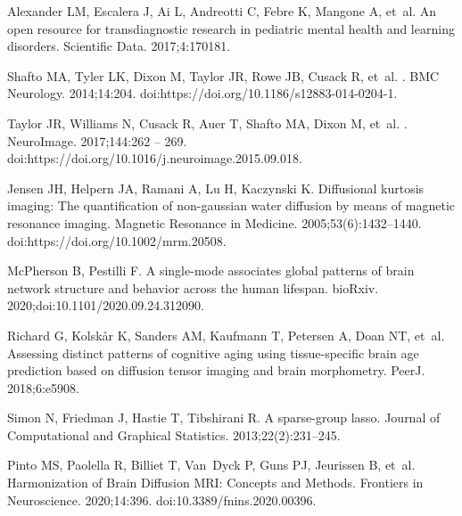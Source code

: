 \documentclass[10pt,letterpaper]{article}
\begin{document}
\begin{thebibliography}{100}
Alexander LM, Escalera J, Ai L, Andreotti C, Febre K, Mangone A, et~al.
\newblock An open resource for transdiagnostic research in pediatric mental
  health and learning disorders.
\newblock Scientific Data. 2017;4:170181.

Shafto MA, Tyler LK, Dixon M, Taylor JR, Rowe JB, Cusack R, et~al.
.
\newblock BMC Neurology. 2014;14:204.
\newblock doi:{https://doi.org/10.1186/s12883-014-0204-1}.

Taylor JR, Williams N, Cusack R, Auer T, Shafto MA, Dixon M, et~al.
.
\newblock NeuroImage. 2017;144:262 -- 269.
\newblock doi:{https://doi.org/10.1016/j.neuroimage.2015.09.018}.

Jensen JH, Helpern JA, Ramani A, Lu H, Kaczynski K.
\newblock Diffusional kurtosis imaging: The quantification of non-gaussian
  water diffusion by means of magnetic resonance imaging.
\newblock Magnetic Resonance in Medicine. 2005;53(6):1432--1440.
\newblock doi:{https://doi.org/10.1002/mrm.20508}.

{McPherson} B, Pestilli F.
\newblock A single-mode associates global patterns of brain network structure
  and behavior across the human lifespan.
\newblock bioRxiv. 2020;doi:{10.1101/2020.09.24.312090}.

Richard G, Kolsk{\aa}r K, Sanders AM, Kaufmann T, Petersen A, Doan NT, et~al.
\newblock Assessing distinct patterns of cognitive aging using tissue-specific
  brain age prediction based on diffusion tensor imaging and brain morphometry.
\newblock PeerJ. 2018;6:e5908.

Simon N, Friedman J, Hastie T, Tibshirani R.
\newblock A sparse-group lasso.
\newblock Journal of Computational and Graphical Statistics.
  2013;22(2):231--245.

Pinto MS, Paolella R, Billiet T, Van~Dyck P, Guns PJ, Jeurissen B, et~al.
\newblock Harmonization of Brain Diffusion MRI: Concepts and Methods.
\newblock Frontiers in Neuroscience. 2020;14:396.
\newblock doi:{10.3389/fnins.2020.00396}.


\end{thebibliography}
\end{document}

